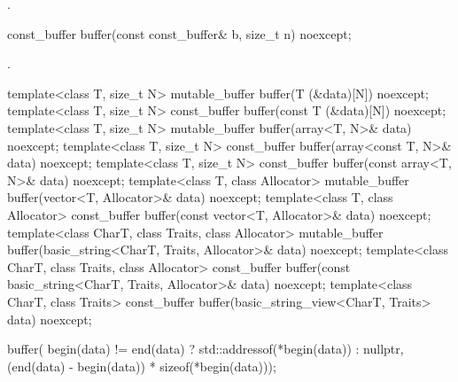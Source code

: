 \begin{itemdescr}
\pnum
\returns {}.
\end{itemdescr}

\begin{itemdecl}
const_buffer buffer(const const_buffer& b, size_t n) noexcept;
\end{itemdecl}

\begin{itemdescr}
\pnum
\returns {}.
\end{itemdescr}

\begin{itemdecl}
template<class T, size_t N>
  mutable_buffer buffer(T (&data)[N]) noexcept;
template<class T, size_t N>
  const_buffer buffer(const T (&data)[N]) noexcept;
template<class T, size_t N>
  mutable_buffer buffer(array<T, N>& data) noexcept;
template<class T, size_t N>
  const_buffer buffer(array<const T, N>& data) noexcept;
template<class T, size_t N>
  const_buffer buffer(const array<T, N>& data) noexcept;
template<class T, class Allocator>
  mutable_buffer buffer(vector<T, Allocator>& data) noexcept;
template<class T, class Allocator>
  const_buffer buffer(const vector<T, Allocator>& data) noexcept;
template<class CharT, class Traits, class Allocator>
  mutable_buffer buffer(basic_string<CharT, Traits, Allocator>& data) noexcept;
template<class CharT, class Traits, class Allocator>
  const_buffer buffer(const basic_string<CharT, Traits, Allocator>& data) noexcept;
template<class CharT, class Traits>
  const_buffer buffer(basic_string_view<CharT, Traits> data) noexcept;
\end{itemdecl}

\begin{itemdescr}
\pnum
\returns
\begin{codeblock}
buffer(
  begin(data) != end(data) ? std::addressof(*begin(data)) : nullptr,
  (end(data) - begin(data)) * sizeof(*begin(data)));
\end{codeblock}

\end{itemdescr}

